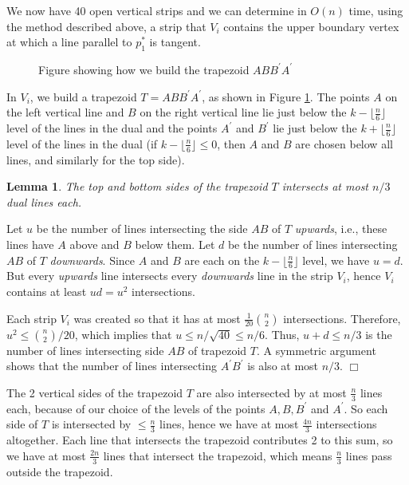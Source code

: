 \documentclass{elsart}
\newtheorem{lemma}{Lemma}
\newenvironment{proof}{{\bf Proof:} \rm}{\hfill $\Box$ \medskip\\}
\begin{document}
We now have 40 open vertical strips and we can determine in $O(n)$
time, using the method described above, a strip that $V_i$ contains
the upper boundary vertex at which a line parallel to $p_1^*$ is
tangent. 

\begin{figure}
 \begin{center}
   \caption{\label{fig_trapezoid}Figure showing how we build the trapezoid $ABB^{\prime}A^{\prime}$}
 \end{center}
\end{figure}

In $V_i$, we build a trapezoid $T = ABB^{\prime}A^{\prime}$, as shown
in Figure \ref{fig_trapezoid}. The points $A$ on the left vertical
line and $B$ on the right vertical line lie just below the $k -
\lfloor\frac{n}{6}\rfloor$ level of the lines in the dual and the
points $A^{\prime}$ and $B^{\prime}$ lie just below the $k +
\lfloor\frac{n}{6}\rfloor$ level of the lines in the dual (if $k -
\lfloor\frac{n}{6}\rfloor \le 0$, then $A$ and $B$ are chosen below
all lines, and similarly for the top side).

\begin{lemma}\label{lemma_trapezoid}
The top and bottom sides of the trapezoid $T$ intersects at most 
$n/3$ dual lines each.
\end{lemma}

\begin{proof}
Let $u$ be the number of lines intersecting the side $AB$ of $T$
\emph{upwards}, i.e., these lines have $A$ above and $B$ below them.
Let $d$ be the number of lines intersecting $AB$ of $T$
\emph{downwards}. Since $A$ and $B$ are each on the
$k-\lfloor\frac{n}{6}\rfloor$ level, we have $u = d$. But every
\emph{upwards} line intersects every \emph{downwards} line in the
strip $V_i$, hence $V_i$ contains at least $ud=u^2$ intersections.

Each
strip $V_i$ was created so that it has at most
$\frac{1}{20}{n\choose 2}$ intersections. Therefore, 
            $u^2 \le {n \choose 2}/20$, which implies that
$u \le n/\sqrt{40} \le n/6$.
Thus, $u+d\le n/3$ is the number of lines intersecting side $AB$ of
trapezoid $T$. A symmetric argument shows that the number of lines
intersecting 
$A^{\prime}B^{\prime}$ is also at most $n/3$.
\end{proof}

The 2 vertical sides of the trapezoid $T$ are also intersected by at
most $\frac{n}{3}$ lines each, because of our choice of the levels of
the points $A, B, B^{\prime}$ and $A^{\prime}$. So each side of $T$ is
intersected by $\le \frac{n}{3}$ lines, hence we have at most
$\frac{4n}{3}$ intersections altogether. Each line that intersects the
trapezoid contributes 2 to this sum, so we have at most $\frac{2n}{3}$
lines that intersect the trapezoid, which means $\frac{n}{3}$ lines
pass outside the trapezoid.
\end{document}
